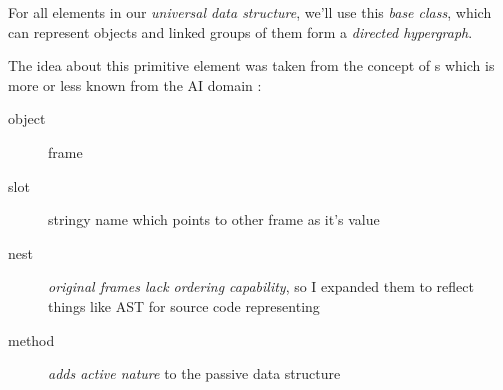 \clearpage
{}\label{object}\secdown

For all elements in our \emph{universal data structure}, we'll use this
\emph{base class}, which can represent objects and linked groups of them form a
\emph{directed hypergraph}.


The idea about this primitive element was taken from the concept of
s which is more or less known from the AI domain \cite{minsky}:
\begin{description}
    \item[object] frame
    \item[slot] stringy name which points to other frame as it's value
    \item[nest] \emph{original frames lack ordering capability}, so I expanded
    them to reflect things like AST for source code representing
    \item[method] \emph{adds active nature} to the passive data structure
\end{description}

\secup
